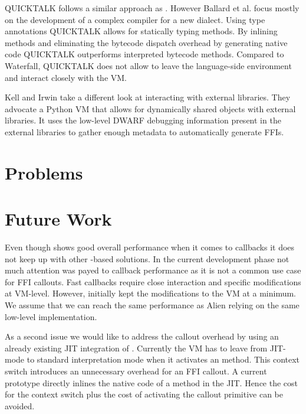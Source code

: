 QUICKTALK \cite{Ball86a} follows a similar approach as \NB.
However Ballard et al. focus mostly on the development of a complex compiler for a new \ST dialect.
Using type annotations QUICKTALK allows for statically typing methods.
By inlining methods and eliminating the bytecode dispatch overhead by generating native code QUICKTALK outperforms interpreted bytecode methods.
Compared to Waterfall, QUICKTALK does not allow to leave the language-side environment and interact closely with the VM.


Kell and Irwin \cite{Kell11a} take a different look at interacting with external libraries.
They advocate a Python VM that allows for dynamically shared objects with external libraries.
It uses the low-level DWARF debugging information present in the external libraries to gather enough metadata to automatically generate FFIs.

\section{Problems}


\section{Future Work}
Even though \NB shows good overall performance when it comes to callbacks it does not keep up with other \ST-based solutions.
In the current development phase not much attention was payed to callback performance as it is not a common use case for FFI callouts.
Fast callbacks require close interaction and specific modifications at VM-level.
However, initially \NB kept the modifications to the VM at a minimum.
We assume that we can reach the same performance as Alien relying on the same low-level implementation.

As a second issue we would like to address the callout overhead by using an already existing JIT integration of \NB.
Currently the VM has to leave from JIT-mode to standard interpretation mode when it activates an \NB method.
This context switch introduces an unnecessary overhead for an FFI callout.
A current prototype directly inlines the native code of a \NB method in the JIT.
Hence the cost for the context switch plus the cost of activating the \NB callout primitive can be avoided.



